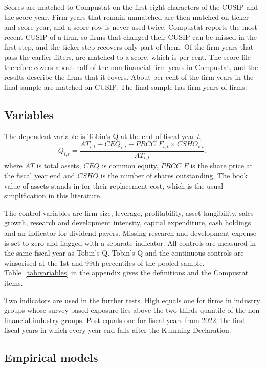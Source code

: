 \documentclass[12pt,a4paper]{article}
\begin{document}
Scores are matched to Compustat on the first eight characters of the CUSIP and the score year. Firm-years that remain unmatched are then matched on ticker and score year, and a score row is never used twice. Compustat reports the most recent CUSIP of a firm, so firms that changed their CUSIP can be missed in the first step, and the ticker step recovers only part of them. Of the \nGics{} firm-years that pass the earlier filters, \nMatched{} are matched to a score, which is \pctMatched{} per cent. The score file therefore covers about half of the non-financial firm-years in Compustat, and the results describe the firms that it covers. About \pctCusip{} per cent of the firm-years in the final sample are matched on CUSIP. The final sample has \nFinal{} firm-years of \nFirmsFinal{} firms.

\subsection{Variables}

The dependent variable is Tobin's Q at the end of fiscal year $t$,
\begin{equation}
Q_{i,t} = \frac{AT_{i,t} - CEQ_{i,t} + PRCC\_F_{i,t} \times CSHO_{i,t}}{AT_{i,t}},
\end{equation}
where $AT$ is total assets, $CEQ$ is common equity, $PRCC\_F$ is the share price at the fiscal year end and $CSHO$ is the number of shares outstanding. The book value of assets stands in for their replacement cost, which is the usual simplification in this literature.

The control variables are firm size, leverage, profitability, asset tangibility, sales growth, research and development intensity, capital expenditure, cash holdings and an indicator for dividend payers. Missing research and development expense is set to zero and flagged with a separate indicator. All controls are measured in the same fiscal year as Tobin's Q. Tobin's Q and the continuous controls are winsorised at the 1st and 99th percentiles of the pooled sample. Table~\ref{tab:variables} in the appendix gives the definitions and the Compustat items.

Two indicators are used in the further tests. High equals one for firms in industry groups whose survey-based exposure lies above the two-thirds quantile of the non-financial industry groups. Post equals one for fiscal years from 2022, the first fiscal years in which every year end falls after the Kunming Declaration.

\subsection{Empirical models}
\end{document}
